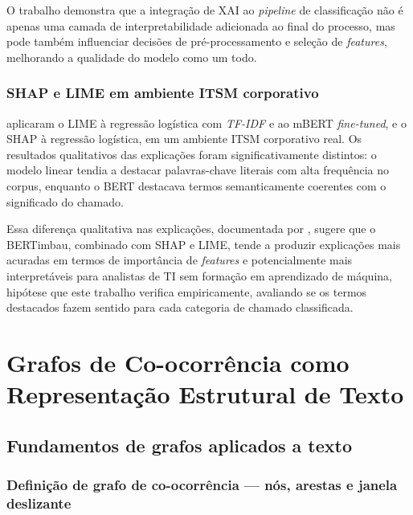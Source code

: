 \documentclass[
    12pt,                %
    openright,           %
    oneside,             %
    a4paper,             %
    english,             %
    brazil               %
]{abntex2}
\begin{document}
O trabalho demonstra que a integração de XAI ao \textit{pipeline} 
de classificação não é apenas uma camada de interpretabilidade 
adicionada ao final do processo, mas pode também influenciar 
decisões de pré-processamento e seleção de \textit{features}, 
melhorando a qualidade do modelo como um todo.

\subsubsection{SHAP e LIME em ambiente ITSM corporativo}
\label{subsubsec:xai_razma}

 aplicaram o LIME à regressão logística com \textit{TF-IDF} e ao mBERT \textit{fine-tuned}, e o SHAP à regressão logística, em um ambiente ITSM corporativo real. Os resultados qualitativos das explicações foram significativamente distintos: o modelo linear tendia a destacar palavras-chave literais com alta frequência no corpus, enquanto o BERT destacava termos semanticamente coerentes com o significado do chamado.

Essa diferença qualitativa nas explicações, documentada por 
, sugere que o BERTimbau, combinado com SHAP 
e LIME, tende a produzir explicações mais acuradas em termos de 
importância de \textit{features} e potencialmente mais interpretáveis 
para analistas de TI sem formação em aprendizado de máquina, hipótese que este trabalho verifica empiricamente, 
avaliando se os termos destacados fazem sentido para cada categoria 
de chamado classificada.

\section{Grafos de Co-ocorrência como Representação Estrutural de Texto}
\label{sec:grafos}

\subsection{Fundamentos de grafos aplicados a texto}
\label{subsec:grafos_fundamentos}

\subsubsection{Definição de grafo de co-ocorrência — nós, arestas e janela deslizante}
\label{subsubsec:grafos_definicao}
\end{document}
